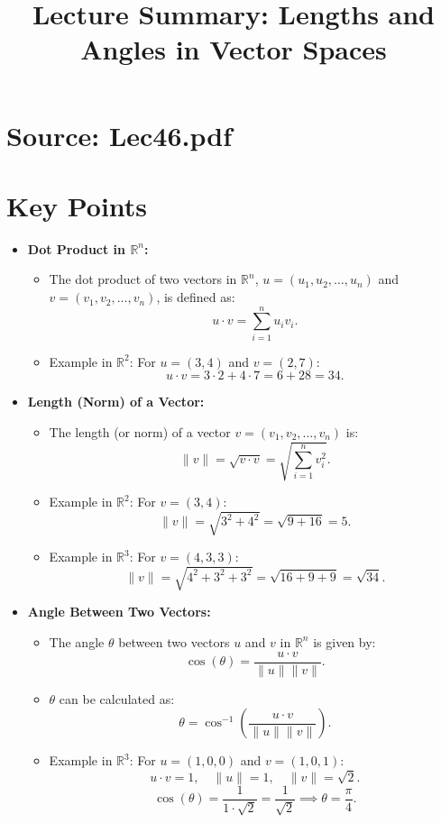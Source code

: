 \documentclass{article}
\title{Lecture Summary: Lengths and Angles in Vector Spaces}
\author{}
\date{}
\begin{document}
\maketitle

\section*{Source: Lec46.pdf}

\section*{Key Points}

\begin{itemize}
  \item \textbf{Dot Product in $\mathbb{R}^n$:}
    \begin{itemize}
      \item The dot product of two vectors in $\mathbb{R}^n$, $u = (u_1, u_2, \dots, u_n)$ and $v = (v_1, v_2, \dots, v_n)$, is defined as:
        \[
          u \cdot v = \sum_{i=1}^n u_i v_i.
        \]
      \item Example in $\mathbb{R}^2$: For $u = (3, 4)$ and $v = (2, 7)$:
        \[
          u \cdot v = 3 \cdot 2 + 4 \cdot 7 = 6 + 28 = 34.
        \]
    \end{itemize}

  \item \textbf{Length (Norm) of a Vector:}
    \begin{itemize}
      \item The length (or norm) of a vector $v = (v_1, v_2, \dots, v_n)$ is:
        \[
          \|v\| = \sqrt{v \cdot v} = \sqrt{\sum_{i=1}^n v_i^2}.
        \]
      \item Example in $\mathbb{R}^2$: For $v = (3, 4)$:
        \[
          \|v\| = \sqrt{3^2 + 4^2} = \sqrt{9 + 16} = 5.
        \]
      \item Example in $\mathbb{R}^3$: For $v = (4, 3, 3)$:
        \[
          \|v\| = \sqrt{4^2 + 3^2 + 3^2} = \sqrt{16 + 9 + 9} = \sqrt{34}.
        \]
    \end{itemize}

  \item \textbf{Angle Between Two Vectors:}
    \begin{itemize}
      \item The angle $\theta$ between two vectors $u$ and $v$ in $\mathbb{R}^n$ is given by:
        \[
          \cos(\theta) = \frac{u \cdot v}{\|u\| \|v\|}.
        \]
      \item $\theta$ can be calculated as:
        \[
          \theta = \cos^{-1}\left(\frac{u \cdot v}{\|u\| \|v\|}\right).
        \]
      \item Example in $\mathbb{R}^3$: For $u = (1, 0, 0)$ and $v = (1, 0, 1)$:
        \[
          u \cdot v = 1, \quad \|u\| = 1, \quad \|v\| = \sqrt{2}.
        \]
        \[
          \cos(\theta) = \frac{1}{1 \cdot \sqrt{2}} = \frac{1}{\sqrt{2}} \implies \theta = \frac{\pi}{4}.
        \]
    \end{itemize}


\end{itemize}
\end{document}
